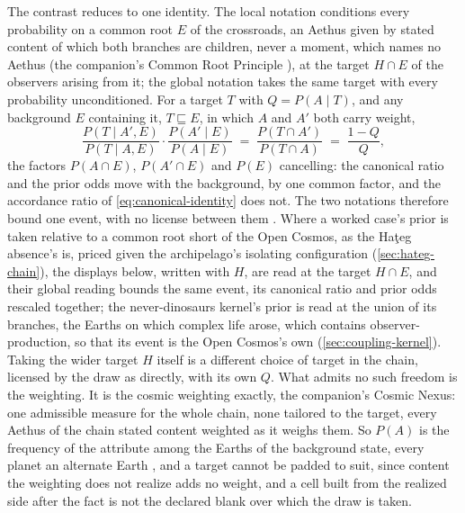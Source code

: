 \documentclass[11pt]{article}
\theoremstyle{definition}
\begin{document}
The contrast reduces to one identity. The local notation conditions every probability on a common root $E$ of the crossroads, an Aethus given by stated content of which both branches are children, never a moment, which names no Aethus (the companion's Common Root Principle \cite{Nexus}), at the target $H \cap E$ of the observers arising from it; the global notation takes the same target with every probability unconditioned. For a target $T$ with $Q = P(A \mid T)$, and any background $E$ containing it, $T \sqsubseteq E$, in which $A$ and $A'$ both carry weight,
\begin{equation}
\label{eq:background-invariance}
\frac{P(T \mid A', E)}{P(T \mid A, E)} \cdot \frac{P(A' \mid E)}{P(A \mid E)} \;=\; \frac{P(T \cap A')}{P(T \cap A)} \;=\; \frac{1-Q}{Q},
\end{equation}
the factors $P(A \cap E)$, $P(A' \cap E)$ and $P(E)$ cancelling: the canonical ratio and the prior odds move with the background, by one common factor, and the accordance ratio of \eqref{eq:canonical-identity} does not. The two notations therefore bound one event, with no license between them \cite{Nexus}. Where a worked case's prior is taken relative to a common root short of the Open Cosmos, as the Ha\c{t}eg absence's is, priced given the archipelago's isolating configuration (\autoref{sec:hateg-chain}), the displays below, written with $H$, are read at the target $H \cap E$, and their global reading bounds the same event, its canonical ratio and prior odds rescaled together; the never-dinosaurs kernel's prior is read at the union of its branches, the Earths on which complex life arose, which contains observer-production, so that its event is the Open Cosmos's own (\autoref{sec:coupling-kernel}). Taking the wider target $H$ itself is a different choice of target in the chain, licensed by the draw as directly, with its own $Q$. What admits no such freedom is the weighting. It is the cosmic weighting exactly, the companion's Cosmic Nexus: one admissible measure for the whole chain, none tailored to the target, every Aethus of the chain stated content weighted as it weighs them. So $P(A)$ is the frequency of the attribute among the Earths of the background state, every planet an alternate Earth \cite{NexicFoundation, Nexus}, and a target cannot be padded to suit, since content the weighting does not realize adds no weight, and a cell built from the realized side after the fact is not the declared blank over which the draw is taken.
\end{document}
